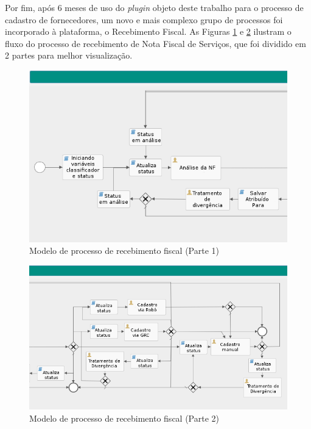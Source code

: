 Por fim, após 6 meses de uso do \textit{plugin} objeto deste trabalho para o processo de cadastro de fornecedores, um novo e mais complexo grupo de processos foi incorporado à plataforma, o Recebimento Fiscal. As Figuras \ref{fig:processo_recebimento_fiscal_1} e \ref{fig:processo_recebimento_fiscal_2} ilustram o fluxo do processo de recebimento de Nota Fiscal de Serviços, que foi dividido em 2 partes para melhor visualização.

\begin{figure}[H]
\centering
\includegraphics[width=1\textwidth]{imagens/processo_recebimento_fiscal(1).png}
\caption{Modelo de processo de recebimento fiscal (Parte 1)}
\label{fig:processo_recebimento_fiscal_1}
\end{figure}

\begin{figure}[H]
\centering
\includegraphics[width=1\textwidth]{imagens/processo_recebimento_fiscal(2).png}
\caption{Modelo de processo de recebimento fiscal (Parte 2)}
\label{fig:processo_recebimento_fiscal_2}
\end{figure}

